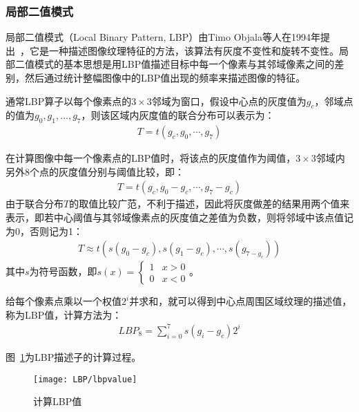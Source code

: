 \subsubsection{局部二值模式}

局部二值模式（Local Binary Pattern, LBP）由Timo Objala等人在1994年提出~\cite{ojala1994performance}，它是一种描述图像纹理特征的方法，该算法有灰度不变性和旋转不变性。局部二值模式的基本思想是用LBP值描述目标中每一个像素与其邻域像素之间的差别，然后通过统计整幅图像中的LBP值出现的频率来描述图像的特征。

通常LBP算子以每个像素点的$3 \times 3$邻域为窗口，假设中心点的灰度值为$g_{c}$，邻域点的值为$g_{0},g_{1},\dots,g_{7}$，则该区域内灰度值的联合分布可以表示为：
\begin{eqnarray}
T=t(g_{c},g_{0},\cdots,g_{7})
\end{eqnarray}

在计算图像中每一个像素点的LBP值时，将该点的灰度值作为阈值，$3 \times 3$邻域内另外8个点的灰度值分别与阈值比较，即：
\begin{eqnarray}
T=t(g_{c},g_{0}-g_{c},\cdots,g_{7}-g_{c})
\end{eqnarray}
由于联合分布$T$的取值比较广范，不利于描述，因此将灰度做差的结果用两个值来表示，即若中心阈值与其邻域像素点的灰度值之差值为负数，则将邻域中该点值记为0，否则记为1：
\begin{eqnarray}
T\approx t(s(g_{0}-g_{c}),s(g_{1}-g_{c}),\cdots,s(g_{7-g_{c}}))
\end{eqnarray}
其中$s$为符号函数，即$s(x)=\left \{ \begin{array}{ll} 1 & x>0\\ 0 & x<0 \end{array}\right.$。

给每个像素点乘以一个权值$2^{i}$并求和，就可以得到中心点周围区域纹理的描述值，称为LBP值，计算方法为：
\begin{eqnarray}
LBP_{8} = \sum^{7}_{i=0}s(g_{i}-g_{c})2^{i}
\end{eqnarray}

图~\ref{fig:lbpvalue}为LBP描述子的计算过程。
\begin{figure}[H] %
  \centering
  \texttt{[image: LBP/lbpvalue]}
  \caption{计算LBP值}
  \label{fig:lbpvalue}
\end{figure}

